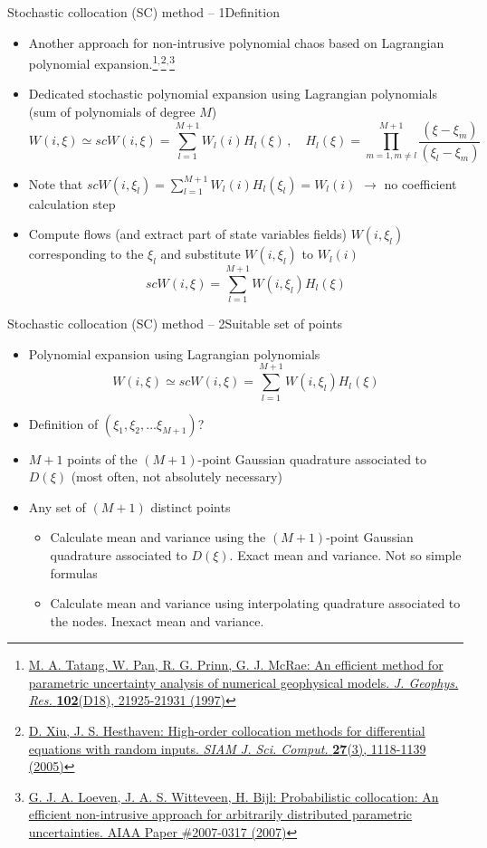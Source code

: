 \documentclass[10pt]{beamer}
\def\vo{\vspace{1mm}}
\def\begit{\begin{itemize}}
\def\endit{\end{itemize}}
\begin{document}
\begin{frame}{Stochastic collocation (SC) method -- 1}{Definition}
%
\footnotesize{
%
\begit
%
\item Another approach for non-intrusive polynomial chaos based on Lagrangian polynomial expansion.\footnote{\href{\webDOI/10.1029/97JD01654}{\scriptsize{M. A. Tatang, W. Pan, R. G. Prinn, G. J. McRae: An efficient method for parametric uncertainty analysis of numerical geophysical models. {\sl J. Geophys. Res.} {\bf 102}(D18), 21925-21931 (1997)}}}$^,$\footnote{\href{\webDOI/10.1137/040615201}{\scriptsize{D. Xiu, J. S. Hesthaven: High-order collocation methods for differential equations with random inputs. {\sl SIAM J. Sci. Comput.} {\bf 27}(3), 1118-1139 (2005)}}}$^,$\footnote{\href{\webDOI/10.2514/6.2007-317}{\scriptsize{G. J. A. Loeven, J. A. S. Witteveen, H. Bijl: Probabilistic collocation: An efficient non-intrusive approach for arbitrarily distributed parametric uncertainties. AIAA Paper \#2007-0317 (2007)}}}

\item Dedicated stochastic polynomial expansion using Lagrangian polynomials (sum of polynomials of degree $M$)
  $$ W(i,\xi) \simeq scW(i,\xi) = \sum_{l=1}^{M+1} W_l(i) H_l(\xi)\,, \quad H_l(\xi) = \prod_{m=1, m\neq l}^{M+1} \displaystyle\frac{(\xi-\xi_m)}{(\xi_l-\xi_m)} $$

\item  Note that $scW(i,\xi_l)=  \sum_{l=1}^{M+1} W_l(i) H_l(\xi_l) = W_l(i)$ $\rightarrow$ no coefficient calculation step
\item Compute flows (and extract part of state variables fields) $W(i,\xi_l)$ corresponding to the $\xi_l$ and substitute $W(i,\xi_l)$ to $W_l(i)$ 
%
 $$  scW(i,\xi) = \sum_{l=1}^{M+1} W(i,\xi_l) H_l(\xi) $$
\endit
%
}
\end{frame} 
%
%
\begin{frame}{Stochastic collocation (SC) method -- 2}{Suitable set of points}
%
\footnotesize{
%
\begit
%
\item Polynomial expansion using Lagrangian polynomials
  $$ W(i,\xi) \simeq scW(i,\xi) = \sum_{l=1}^{M+1} W(i,\xi_l) H_l(\xi) $$
%
\item Definition of $(\xi_1, \xi_2,...\xi_{M+1})$? 
\vo
\item[1] $M+1$ points of the $(M+1)$-point Gaussian quadrature associated to $D(\xi)$ (most often, not absolutely necessary)
\item[2] Any set of $(M+1)$ distinct points
  \vo
  \begit
  \item Calculate mean and variance using the  $(M+1)$-point Gaussian quadrature associated to $D(\xi)$. Exact mean and variance. Not so simple formulas
  \item Calculate mean and variance using interpolating quadrature associated to the nodes. Inexact mean and variance.
  \endit 
%
\endit
%
}
%
\end{frame} 
\end{document}
